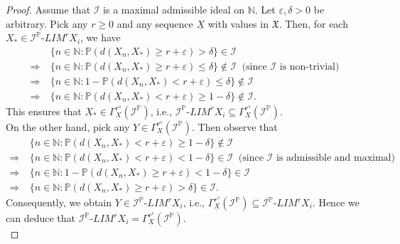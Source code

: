 \documentclass[reqno]{amsart}
\begin{document}
\begin{proof}
	Assume that $\mathcal{I}$ is a maximal admissible ideal on $\mathbb{N}$. Let $\varepsilon,\delta>0$ be arbitrary.
Pick any $r\geq 0$ and any sequence $\underline{X}$ with values in $\mathfrak{X}$. Then, for each $X_*\in\mathcal{I}^{\mathbb{P}}$-$LIM^rX_i$, we have 
\begin{align*}
	&\{n\in\mathbb{N}:\mathbb{P}(d(X_n,X_*)\geq r+\varepsilon)>\delta\}\in\mathcal{I}\\
	\Rightarrow~& \{n\in\mathbb{N}:\mathbb{P}(d(X_n,X_*)\geq r+\varepsilon)\leq\delta\}\notin\mathcal{I}~\mbox{ (since $\mathcal{I}$ is non-trivial)}\\
	\Rightarrow~& \{n\in\mathbb{N}:1-\mathbb{P}(d(X_n,X_*)< r+\varepsilon)\leq\delta\}\notin\mathcal{I}\\
\Rightarrow~& \{n\in\mathbb{N}:\mathbb{P}(d(X_n,X_*)< r+\varepsilon)\geq 1-\delta\}\notin\mathcal{I}.
\end{align*}
This ensures that $X_*\in \Gamma^{r^s}_{\underline{X}}(\mathcal{I}^{\mathbb{P}})$, i.e., $\mathcal{I}^{\mathbb{P}}$-$LIM^rX_i\subseteq\Gamma^{r^s}_{\underline{X}}(\mathcal{I}^{\mathbb{P}})$.\\

On the other hand, pick any $Y\in\Gamma^{r^s}_{\underline{X}}(\mathcal{I}^{\mathbb{P}})$. Then observe that 
\begin{align*}
	&\{n\in\mathbb{N}:\mathbb{P}(d(X_n,X_*)< r+\varepsilon)\geq 1-\delta\}\notin\mathcal{I}\\
	\Rightarrow~& \{n\in\mathbb{N}:\mathbb{P}(d(X_n,X_*)< r+\varepsilon)<1-\delta\}\in\mathcal{I}~\mbox{ (since $\mathcal{I}$ is admissible and maximal)}\\
	\Rightarrow~& \{n\in\mathbb{N}:1-\mathbb{P}(d(X_n,X_*)\geq r+\varepsilon)<1-\delta\}\in\mathcal{I}\\
	\Rightarrow~& \{n\in\mathbb{N}:\mathbb{P}(d(X_n,X_*)\geq r+\varepsilon)>\delta\}\in\mathcal{I}.
\end{align*}
Consequently, we obtain $Y\in\mathcal{I}^{\mathbb{P}}$-$LIM^rX_i$, i.e., $\Gamma^{r^s}_{\underline{X}}(\mathcal{I}^{\mathbb{P}})\subseteq \mathcal{I}^{\mathbb{P}}$-$LIM^rX_i$. Hence we can deduce that $\mathcal{I}^{\mathbb{P}}$-$LIM^rX_i=\Gamma^{r^s}_{\underline{X}}(\mathcal{I}^{\mathbb{P}})$.\\


\end{proof}
\end{document}
